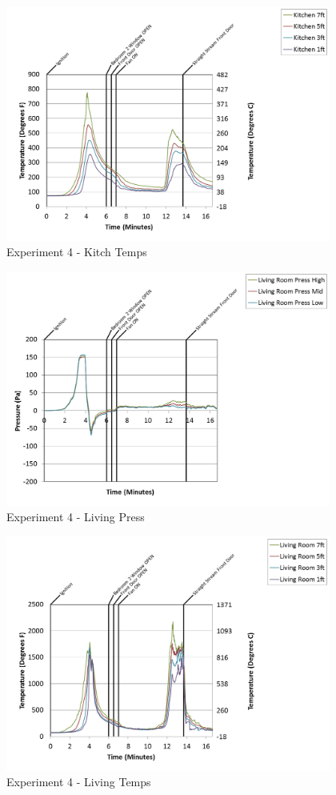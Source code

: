 \documentclass{article}
\begin{document}
\begin{appendices}
\clearpage

\begin{figure}[h!]
	\centering
	\includegraphics[height=3.05in]{0_Images/Results_Charts/Exp_4_Charts/KitchTemps.png}
	\caption{Experiment 4 - Kitch Temps}
\end{figure}


\begin{figure}[h!]
	\centering
	\includegraphics[height=3.05in]{0_Images/Results_Charts/Exp_4_Charts/LivingPress.png}
	\caption{Experiment 4 - Living Press}
\end{figure}

\clearpage

\begin{figure}[h!]
	\centering
	\includegraphics[height=3.05in]{0_Images/Results_Charts/Exp_4_Charts/LivingTemps.png}
	\caption{Experiment 4 - Living Temps}
\end{figure}



\end{appendices}
\end{document}
